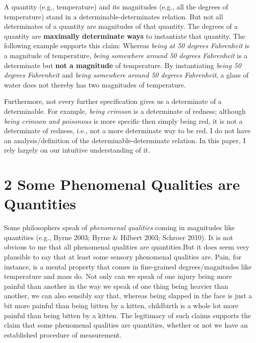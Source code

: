 \documentclass[a4paper,12pt]{article}
\begin{document}

A quantity (e.g., temperature) and its magnitudes (e.g., all the degrees of temperature) stand in a determinable-determinates relation. But not all determinates of a quantity are magnitudes of that quantity. The degrees of a quantity are \textbf{maximally determinate ways} to instantiate that quantity. The following example supports this claim: Whereas \emph{being at 50 degrees Fahrenheit} is a magnitude of temperature, \emph{being somewhere around 50 degrees Fahrenheit} is a determinate but \textbf{not a magnitude} of temperature. By instantiating \emph{being 50 degrees Fahrenheit} and \emph{being somewhere around 50 degrees Fahrenheit}, a glass of water does not thereby has two magnitudes of temperature.

Furthermore, not every further specification gives us a determinate of a determinable. For example, \emph{being crimson} is a determinate of redness; although \emph{being crimson and poisonous} is more specific then simply being red, it is not a determinate of redness, i.e., not a more determinate way to be red. I do not have an analysis/definition of the determinable-determinate relation. In this paper, I rely largely on our intuitive understanding of it.\footnotemark


\section*{2 Some Phenomenal Qualities are Quantities}

Some philosophers speak of \emph{phenomenal qualities} coming in magnitudes like quantities (e.g., Byrne 2003; Byrne \& Hilbert 2003; Schroer 2010). It is not obvious to me that all phenomenal qualities are quantities.\footnotemark But it does seem very plausible to say that at least some sensory phenomenal qualities are. Pain, for instance, is a mental property that comes in fine-grained degrees/magnitudes like temperature and mass do. Not only can we speak of one injury being more painful than another in the way we speak of one thing being heavier than another, we can also sensibly say that, whereas being slapped in the face is just a bit more painful than being bitten by a kitten, childbirth is a whole lot more painful than being bitten by a kitten. The legitimacy of such claims supports the claim that some phenomenal qualities are quantities, whether or not we have an established procedure of measurement.
\end{document}
